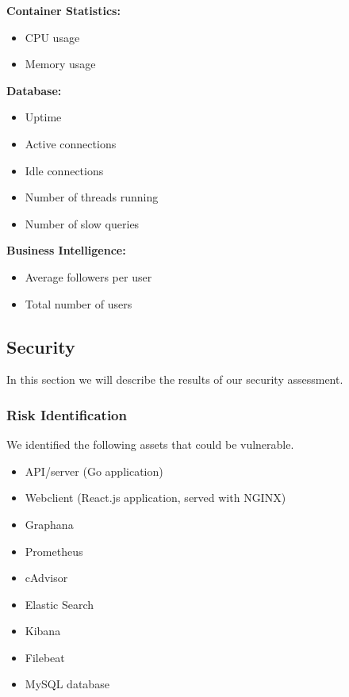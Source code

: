 \documentclass{article}
\begin{document}
\textbf{Container Statistics:}
\begin{itemize}
    \item CPU usage 
    \item Memory usage
\end{itemize}

\textbf{Database:}
\begin{itemize}
    \item Uptime
    \item Active connections
    \item Idle connections
    \item Number of threads running
    \item Number of slow queries
\end{itemize}

\textbf{Business Intelligence:}
\begin{itemize}
    \item Average followers per user
    \item Total number of users
\end{itemize}



\subsection{Security}
In this section we will describe the results of our security assessment.
\subsubsection*{Risk Identification}
We identified the following assets that could be vulnerable.
\begin{itemize}
    \item API/server (Go application)
    \item Webclient (React.js application, served with NGINX)
    \item Graphana
    \item Prometheus
    \item cAdvisor
    \item Elastic Search
    \item Kibana
    \item Filebeat
    \item MySQL database
\end{itemize}
\end{document}
